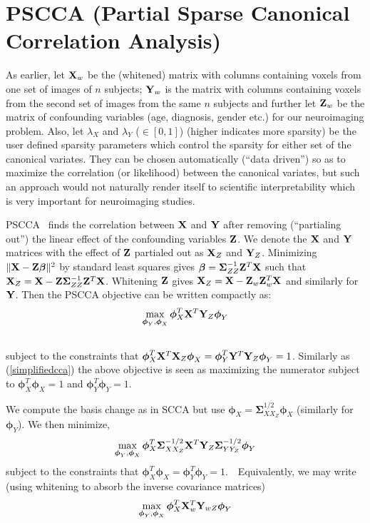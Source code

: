 \documentclass{llncs}
\newcommand{\X}{{\bf X}}
\newcommand{\Y}{{\bf Y}}
\newcommand{\Z}{{\bf Z}}
\newcommand{\bs}{\boldsymbol}
\newcommand{\bSigma}{\boldsymbol \Sigma}
\begin{document}
\section{PSCCA (Partial Sparse Canonical Correlation Analysis)}
As earlier, let $\X_w$ be the (whitened) matrix with columns containing voxels from one set of
images of $n$ subjects; $\Y_w$ is the matrix with columns containing voxels from the second
set of images from the same $n$ subjects and further let $\Z_w$ be the matrix of confounding variables (age, diagnosis, gender etc.) for our neuroimaging problem. Also, let $\lambda_X$ and $\lambda_Y$ ($\in [0,1]$) (higher indicates more sparsity) be the user defined sparsity parameters which control the sparsity for either set of the canonical variates. They can be chosen automatically (``data driven'') so as to maximize the correlation (or likelihood) between the canonical variates, but such an approach would not naturally render itself  to scientific interpretability which is very important for neuroimaging studies. 

PSCCA~\cite{timm} finds the correlation between $\X$ and $\Y$ after
removing (``partialing out'') the linear effect of the confounding
variables $\Z$.  We denote the $\X$ and $\Y$ matrices with the effect
of $\Z$ partialed out as $\X_Z$ and $\Y_Z$.  Minimizing $\| \X - \Z
\bs\beta \|^2 $ by standard least squares gives
 $\bs\beta = \bSigma_{ZZ}^{-1} \Z^T \X$ such that $\X_Z = \X - \Z  \bSigma_{ZZ}^{-1} \Z^T \X$.  Whitening $\Z$ gives $\X_Z=\X - \Z_w \Z_w^T \X$
 and similarly for $\Y$. 
Then the PSCCA objective can be written compactly as:
\begin{eqnarray}
\label{pscca}
\max_{{\bs\phi_Y}, {\bs\phi_X}} \bs\phi_X^T  \X^T \Y_Z \bs\phi_Y \\ \notag
\end{eqnarray}
subject to the constraints that $\bs\phi_X^T \X^T \X_Z \bs\phi_X 
=  \bs\phi_Y^T \Y^T \Y_Z \bs\phi_Y = 1$.
Similarly as (\ref{simplifiedcca}) the above objective is seen as maximizing the numerator subject to  $\bs\phi_X^T\bs\phi_X=1$ and $\bs\phi_Y^T\bs\phi_Y=1$.

We compute the basis change as in SCCA but use $\bs\phi_X=\bSigma^{1/2}_{XX_Z}\bs\phi_X$
(similarly for $\bs\phi_Y$).  We then minimize,
\begin{eqnarray}
\label{pscca}
\max_{{\bs\phi_Y}, {\bs\phi_X}} \bs\phi_X^T \bSigma^{-1/2}_{XX_Z} \X^T \Y_Z \bSigma^{-1/2}_{YY_Z}\bs\phi_Y 
\end{eqnarray}
subject to the constraints that $\bs\phi_X^T \bs\phi_X 
=  \bs\phi_Y^T \bs\phi_Y = 1$.~~Equivalently, we may write (using
whitening to absorb the inverse covariance matrices)
\begin{eqnarray}
\label{pscca}
\max_{{\bs\phi_Y}, {\bs\phi_X}} \bs\phi_X^T \X_w^T \Y_{wZ} \bs\phi_Y 
\end{eqnarray}
\end{document}
